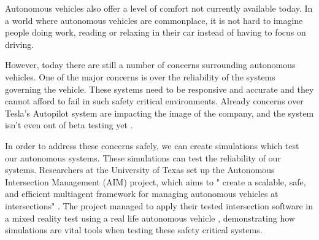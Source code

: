 
Autonomous vehicles also offer a level of comfort not currently available today. In a world where autonomous vehicles are commonplace, it is not hard to imagine people doing work, reading or relaxing in their car instead of having to focus on driving. 

However, today there are still a number of concerns surrounding autonomous vehicles. One of the major concerns is over the reliability of the systems governing the vehicle. These systems need to be responsive and accurate and they cannot afford to fail in such safety critical environments. Already concerns over Tesla's Autopilot system are impacting the image of the company, and the system isn't even out of beta testing yet \citep{TeslaCriticised}. 

In order to address these concerns safely, we can create simulations which test our autonomous systems. These simulations can test the reliability of our systems. Researchers at the University of Texas set up the Autonomous Intersection Management (AIM) project, which aims to " create a scalable, safe, and efficient multiagent framework for managing autonomous vehicles at intersections" \citep{AIMProject}. The project managed to apply their tested intersection software in a mixed reality test using a real life autonomous vehicle \citep{Quinlan2010}, demonstrating how simulations are vital tools when testing these safety critical systems.


